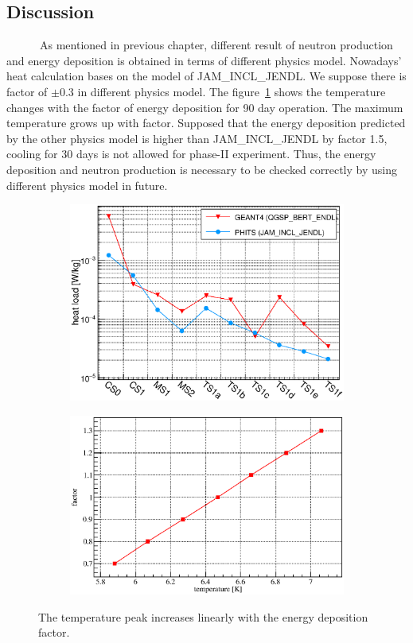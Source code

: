 \subsection{Discussion}
~~~~~~As mentioned in previous chapter, different result of neutron production and energy deposition is obtained in terms of different physics model.
Nowadays' heat calculation bases on the model of JAM\_INCL\_JENDL.
We suppose there is factor of $\pm$0.3 in different physics model.
The figure~\ref{5factor} shows the temperature changes with the factor of energy deposition for 90 day operation.
The maximum temperature grows up with factor.
Supposed that the energy deposition predicted by the other physics model is higher than JAM\_INCL\_JENDL by factor 1.5, cooling for 30 days is not allowed for phase-II experiment.
Thus, the energy deposition and neutron production is necessary to be checked correctly by using different physics model in future.
\begin{figure}[H]
 \begin{subfigure}{0.3\textwidth}
 \centering
 \includegraphics[scale=0.45]{chapter5/fig/g4phs.eps}
 \end{subfigure}
 \hspace{0.2\textwidth}
 \begin{subfigure}{0.3\textwidth}
 \centering
 \includegraphics[scale=0.45]{chapter6/fig/factor.eps}
 \end{subfigure}
 \caption{ The temperature peak increases linearly with the energy deposition factor.}
 \label{5factor}
\end{figure}

